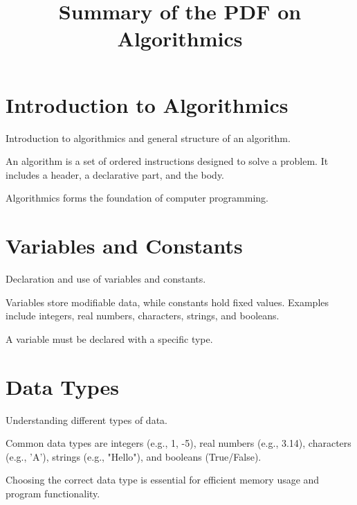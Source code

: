 \documentclass{article}
\title{Summary of the PDF on Algorithmics}
\author{}
\date{}
\begin{document}
\maketitle

\section*{Introduction to Algorithmics}
\begin{description}[leftmargin=!,labelwidth=\widthof{\bfseries Key Concept}]
	\item[Key Concept] Introduction to algorithmics and general structure of an algorithm.
	\item[Content] An algorithm is a set of ordered instructions designed to solve a problem. It includes a header, a declarative part, and the body.
	\item[Notes] Algorithmics forms the foundation of computer programming.
\end{description}

\section*{Variables and Constants}
\begin{description}[leftmargin=!,labelwidth=\widthof{\bfseries Key Concept}]
	\item[Key Concept] Declaration and use of variables and constants.
	\item[Content] Variables store modifiable data, while constants hold fixed values. Examples include integers, real numbers, characters, strings, and booleans.
	\item[Notes] A variable must be declared with a specific type.
\end{description}

\section*{Data Types}
\begin{description}[leftmargin=!,labelwidth=\widthof{\bfseries Key Concept}]
	\item[Key Concept] Understanding different types of data.
	\item[Content] Common data types are integers (e.g., 1, -5), real numbers (e.g., 3.14), characters (e.g., 'A'), strings (e.g., "Hello"), and booleans (True/False).
	\item[Notes] Choosing the correct data type is essential for efficient memory usage and program functionality.
\end{description}
\end{document}
